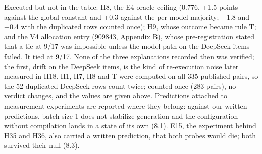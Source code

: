 Executed but not in the table: H8, the E4 oracle ceiling (0.776, +1.5 points against the global constant and +0.3 against the per-model majority; +1.8 and +0.4 with the duplicated rows counted once); H9, whose outcome became rule T; and the V4 allocation entry (909843, Appendix B), whose pre-registration stated that a tie at 9/17 was impossible unless the model path on the DeepSeek items failed. It tied at 9/17. None of the three explanations recorded then was verified; the first, drift on the DeepSeek items, is the kind of re-execution noise later measured in H18. H1, H7, H8 and T were computed on all 335 published pairs, so the 52 duplicated DeepSeek rows count twice; counted once (283 pairs), no verdict changes, and the values are given above. Predictions attached to measurement experiments are reported where they belong: against our written predictions, batch size 1 does not stabilize generation and the configuration without compilation lands in a state of its own (8.1). E15, the experiment behind H35 and H36, also carried a written prediction, that both probes would die; both survived their null (8.3).

